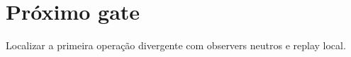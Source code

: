 \section{Próximo gate}
Localizar a primeira operação divergente com observers neutros e replay local.

